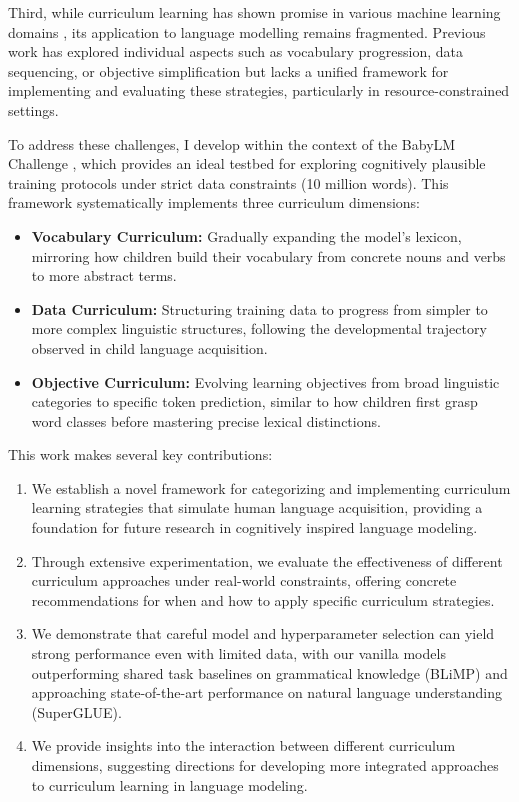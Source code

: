 Third, while curriculum learning has shown promise in various machine learning domains \citep{bengio2009curriculum}, its application to language modelling remains fragmented. Previous work has explored individual aspects such as vocabulary progression, data sequencing, or objective simplification but lacks a unified framework for implementing and evaluating these strategies, particularly in resource-constrained settings.

To address these challenges, I develop \climb within the context of the BabyLM Challenge \citep{warstadt2023babylm1}, which provides an ideal testbed for exploring cognitively plausible training protocols under strict data constraints (10 million words). This framework systematically implements three curriculum dimensions:

\begin{itemize}
    \item \textbf{Vocabulary Curriculum:} Gradually expanding the model's lexicon, mirroring how children build their vocabulary from concrete nouns and verbs to more abstract terms.
    \item \textbf{Data Curriculum:} Structuring training data to progress from simpler to more complex linguistic structures, following the developmental trajectory observed in child language acquisition.
    \item \textbf{Objective Curriculum:} Evolving learning objectives from broad linguistic categories to specific token prediction, similar to how children first grasp word classes before mastering precise lexical distinctions.
\end{itemize}


This work makes several key contributions:

\begin{enumerate}
    \item We establish a novel framework for categorizing and implementing curriculum learning strategies that simulate human language acquisition, providing a foundation for future research in cognitively inspired language modeling.
    
    \item Through extensive experimentation, we evaluate the effectiveness of different curriculum approaches under real-world constraints, offering concrete recommendations for when and how to apply specific curriculum strategies.
    
    \item We demonstrate that careful model and hyperparameter selection can yield strong performance even with limited data, with our vanilla models outperforming shared task baselines on grammatical knowledge (BLiMP) and approaching state-of-the-art performance on natural language understanding (SuperGLUE).
    
    \item We provide insights into the interaction between different curriculum dimensions, suggesting directions for developing more integrated approaches to curriculum learning in language modeling.
\end{enumerate}

